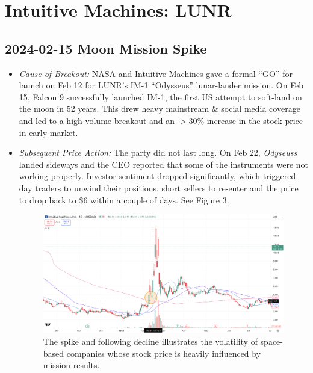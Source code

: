 \documentclass[11pt]{article}
\begin{document}
\section{Intuitive Machines: LUNR}
    \subsection{2024-02-15 Moon Mission Spike}
        \begin{itemize}
            \item \textit{Cause of Breakout:} NASA and Intuitive Machines gave a formal ``GO'' for launch on Feb 12 for LUNR's IM-1 ``Odysseus'' lunar-lander mission. On Feb 15, Falcon 9 successfully launched IM-1, the first US attempt to soft-land on the moon in 52 years. This drew heavy mainstream \& social media coverage and led to a high volume breakout and an $>$30\% increase in the stock price in early-market.
            \item \textit{Subsequent Price Action:} The party did not last long. On Feb 22, \textit{Odyseuss} landed sideways and the CEO reported that some of the instruments were not working properly. Investor sentiment dropped significantly, which triggered day traders to unwind their positions, short sellers to re-enter and the price to drop back to \$6 within a couple of days. See Figure 3.
            \begin{figure}[h]
                \centering \includegraphics[width=0.8\linewidth]{images/LUNR1.png}
                \caption{The spike and following decline illustrates the volatility of space-based companies whose stock price is heavily influenced by mission results.}
            \end{figure}
        \end{itemize}
\end{document}
